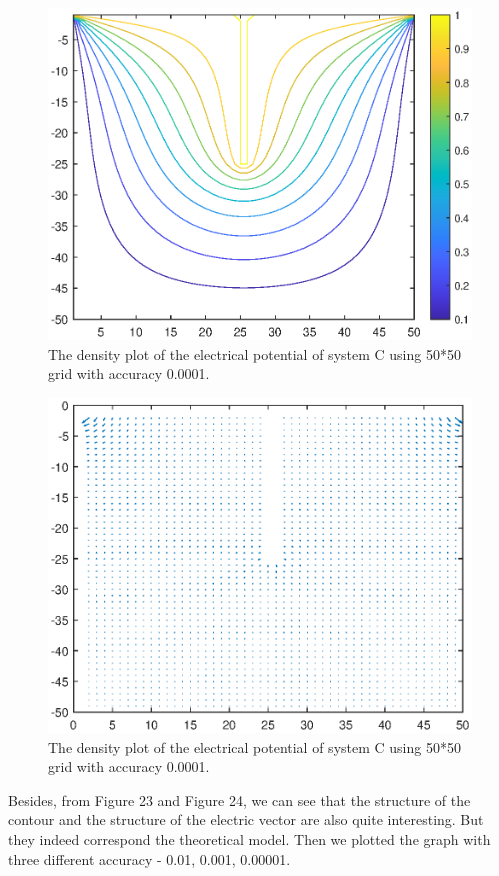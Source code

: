 \documentclass[12pt]{report}
\begin{document}
\begin{figure}[H]
    \centering
    \includegraphics[width=0.8\linewidth]{C00001Contour.eps}
    \caption{The density plot of the electrical potential of system C using 50*50 grid with accuracy 0.0001.}
\end{figure}
\begin{figure}[H]
    \centering
    \includegraphics[width=0.8\linewidth]{C00001Vector.eps}
    \caption{The density plot of the electrical potential of system C using 50*50 grid with accuracy 0.0001.}
\end{figure}
Besides, from Figure 23 and Figure 24, we can see that the structure of the contour and the structure of the electric vector are also quite interesting. But they indeed correspond the theoretical model.
Then we plotted the graph with three different accuracy - 0.01, 0.001, 0.00001.
\end{document}
